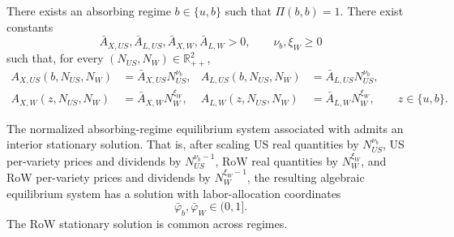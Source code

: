 \documentclass{article}
\begin{document}
\begin{ass}\label{ass_primitive_bg_branch}
There exists an absorbing regime $b\in\{u,b\}$ such that $\Pi(b,b)=1$. There exist constants
\[
\bar A_{X,US},\bar A_{L,US},\bar A_{X,W},\bar A_{L,W}>0,
\qquad
\nu_b,\xi_W\ge 0
\]
such that, for every $(N_{US},N_W)\in\mathbb R_{++}^2$,
\begin{align}
A_{X,US}(b,N_{US},N_W)&=\bar A_{X,US}N_{US}^{\nu_b},
&
A_{L,US}(b,N_{US},N_W)&=\bar A_{L,US}N_{US}^{\nu_b},
\label{bg_us_primitives}\\
A_{X,W}(z,N_{US},N_W)&=\bar A_{X,W}N_W^{\xi_W},
&
A_{L,W}(z,N_{US},N_W)&=\bar A_{L,W}N_W^{\xi_W},
\qquad z\in\{u,b\}.
\label{bg_w_primitives}
\end{align}

The normalized absorbing-regime equilibrium system associated with  admits an interior stationary solution. That is, after scaling US real quantities by $N_{US}^{\nu_b}$, US per-variety prices and dividends by $N_{US}^{\nu_b-1}$, RoW real quantities by $N_W^{\xi_W}$, and RoW per-variety prices and dividends by $N_W^{\xi_W-1}$, the resulting algebraic equilibrium system has a solution with labor-allocation coordinates
\[
\bar\varphi_b,\bar\varphi_W\in(0,1].
\]
The RoW stationary solution is common across regimes.
\end{ass}
\end{document}
